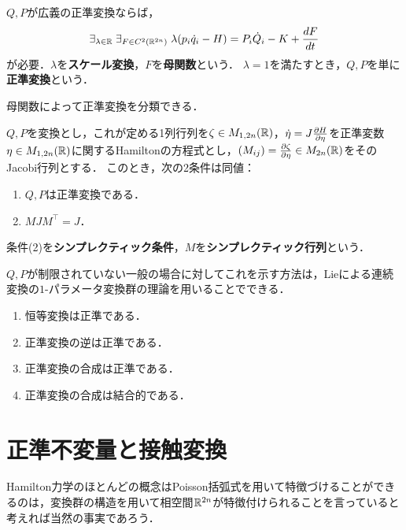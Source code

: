 \documentclass[uplatex, dvipdfmx]{jsreport}
\begin{document}
\begin{lemma}[正準変換の正規化と母関数による定式化]
    $Q,P$が広義の正準変換ならば，
    \[\exists_{\lambda\in\mathbb{R}}\;\exists_{F\in C^2(\mathbb{R}^{2n})}\;\lambda(p_i\dot{q}_i-H)=P_i\dot{Q}_i-K+\frac{d F}{d t}\]
    が必要．$\lambda$を\textbf{スケール変換}，$F$を\textbf{母関数}という．
    $\lambda=1$を満たすとき，$Q,P$を単に\textbf{正準変換}という．
\end{lemma}
\begin{remarks}
    母関数によって正準変換を分類できる．
\end{remarks}

\begin{theorem}[symplecticな定式化]
    $Q,P$を変換とし，これが定める1列行列を$\zeta\in M_{1,2n}(\mathbb{R})$，$\dot{\eta}=J\frac{\partial H}{\partial \eta}$を正準変数$\eta\in M_{1,2n}(\mathbb{R})$に関するHamiltonの方程式とし，$(M_{ij})=\frac{\partial \zeta}{\partial \eta}\in M_{2n}(\mathbb{R})$をそのJacobi行列とする．
    このとき，次の2条件は同値：
    \begin{enumerate}
        \item $Q,P$は正準変換である．
        \item $MJM^\top=J$．
    \end{enumerate}
    条件(2)を\textbf{シンプレクティック条件}，$M$を\textbf{シンプレクティック行列}という．
\end{theorem}
\begin{history}
    $Q,P$が制限されていない一般の場合に対してこれを示す方法は，Lieによる連続変換の$1$-パラメータ変換群の理論を用いることでできる．
\end{history}

\begin{proposition}[正準変換の群]\mbox{}
    \begin{enumerate}
        \item 恒等変換は正準である．
        \item 正準変換の逆は正準である．
        \item 正準変換の合成は正準である．
        \item 正準変換の合成は結合的である．
    \end{enumerate}
\end{proposition}

\section{正準不変量と接触変換}

\begin{tcolorbox}[colframe=ForestGreen, colback=ForestGreen!10!white,breakable,colbacktitle=ForestGreen!40!white,coltitle=black,fonttitle=\bfseries\sffamily,
title=]
    Hamilton力学のほとんどの概念はPoisson括弧式を用いて特徴づけることができるのは，変換群の構造を用いて相空間$\mathbb{R}^{2n}$が特徴付けられることを言っていると考えれば当然の事実であろう．
\end{tcolorbox}
\end{document}
